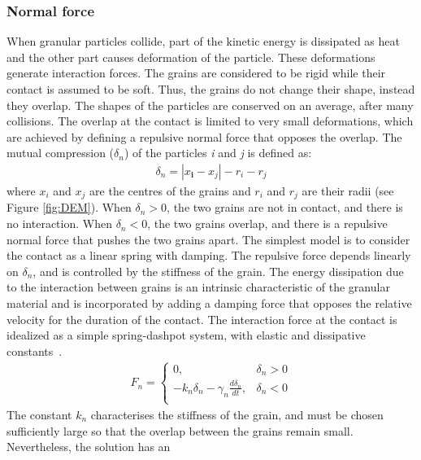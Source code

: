 \subsubsection*{Normal force}
When granular particles collide, part of the kinetic energy is dissipated as 
heat and the other 
part causes deformation of the particle. These deformations generate 
interaction forces. The 
grains 
are considered to be rigid while their contact is assumed to be soft. Thus, the 
grains do not 
change their shape, instead they overlap. The shapes of the particles are 
conserved on an average, 
after many collisions. The overlap at the contact is limited to very small 
deformations, which are 
achieved by defining a repulsive normal force that opposes the overlap. The 
mutual compression 
($\delta_{n}$) of the particles \textit{i} and \textit{j} is defined as:
\begin{align}
 \delta_{n}=\left|x_{\mathbf{i}}-x_{\mathit{j}}\right|-r_{i}-r_{j}
\label{eq:delta}
\end{align}
where $x_{\mathit{i}}$ and $x_{\mathit{j}}$ are the centres of the grains and  
$r_{\mathit{i}}$ 
and 
$r_{\mathit{j}}$ are their radii (see Figure \ref{fig:DEM}). When 
$\delta_{n}>0$, the two grains 
are not in contact, and there is no interaction. When $\delta_{n}<0$, the two 
grains overlap, and 
there 
is a repulsive normal force that pushes the two grains apart. The simplest 
model is to consider 
the 
contact as a linear spring with damping. The repulsive force depends linearly 
on $\delta_{n}$, and 
is controlled by the stiffness of the grain. The energy dissipation due to the 
interaction between 
grains is an intrinsic characteristic of the granular material and is 
incorporated by adding a 
damping force that opposes the relative velocity for the duration of the 
contact. The interaction 
force at the contact is idealized as a simple spring-dashpot system, with 
elastic and dissipative 
constants~\citep{Luding1994}. 
\begin{align}
 {{F}_{n}}=
\begin{cases}
0, & {{\delta}_{n}}>0 \\
-{{k}_{n}}{{\delta}_{n}}-{{\gamma}_{n}}\frac{d{{\delta}_{n}}}{dt}, & 
{{\delta}_{n}}<0 \\
\end{cases}
\end{align} 
The constant ${k}_{n}$ characterises the stiffness of the grain, and must be 
chosen sufficiently 
large so that the overlap between the grains remain small. Nevertheless, the 
solution has an 
